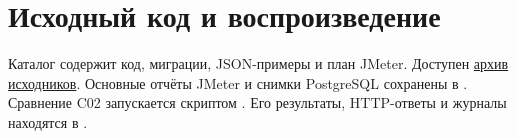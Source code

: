 \clearpage
\section{Исходный код и воспроизведение}
Каталог  содержит код, миграции, JSON-примеры и план JMeter. Доступен \href{../../verification/Lab2/source-current.tar.gz}{архив исходников}. Основные отчёты JMeter и снимки PostgreSQL сохранены в . Сравнение C02 запускается скриптом . Его результаты, HTTP-ответы и журналы находятся в .
